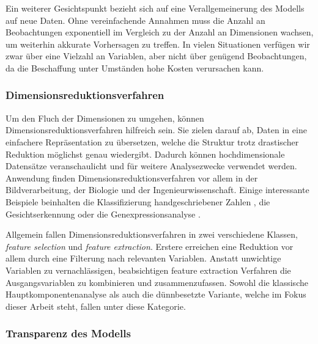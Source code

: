 Ein weiterer Gesichtspunkt bezieht sich auf eine Verallgemeinerung des Modells auf neue Daten. Ohne vereinfachende Annahmen muss die Anzahl an Beobachtungen exponentiell im Vergleich zu der Anzahl an Dimensionen wachsen, um weiterhin akkurate Vorhersagen zu treffen. In vielen Situationen verfügen wir zwar über eine Vielzahl an Variablen, aber nicht über genügend Beobachtungen, da die Beschaffung unter Umständen hohe Kosten verursachen kann. 




\subsubsection{Dimensionsreduktionsverfahren}

Um den Fluch der Dimensionen zu umgehen, können Dimensionsreduktionsverfahren hilfreich sein. Sie zielen darauf ab, Daten in eine einfachere Repräsentation zu übersetzen, welche die Struktur trotz drastischer Reduktion möglichst genau wiedergibt. Dadurch können hochdimensionale Datensätze veranschaulicht und für weitere Analysezwecke verwendet werden. Anwendung finden Dimensionsreduktionsverfahren vor allem in der Bildverarbeitung, der Biologie und der Ingenieurwissenschaft. Einige interessante Beispiele beinhalten die Klassifizierung handgeschriebener Zahlen \cite{hastie_elements}, die Gesichtserkennung \cite{hancock} oder die Genexpressionsanalyse \cite{alter}.

Allgemein fallen Dimensionsreduktionsverfahren in zwei verschiedene Klassen, \textit{feature selection} und \textit{feature extraction}. Erstere erreichen eine Reduktion vor allem durch eine Filterung nach relevanten Variablen. Anstatt unwichtige Variablen zu vernachlässigen, beabsichtigen feature extraction Verfahren die Ausgangsvariablen zu kombinieren und zusammenzufassen. Sowohl die klassische Hauptkomponentenanalyse als auch die dünnbesetzte Variante, welche im Fokus dieser Arbeit steht, fallen unter diese Kategorie.




\subsubsection{Transparenz des Modells}

